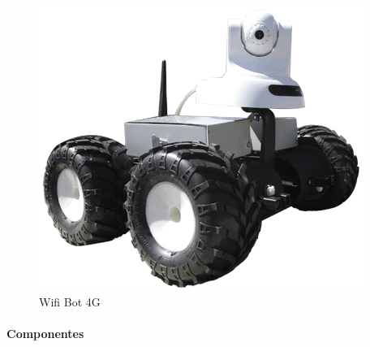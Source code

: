 \documentclass[twoside,12pt]{article}
\begin{document}
\begin{figure}[ht]
\centering
\includegraphics[scale=0.5]{images/Visuel_Wifibot_2.png} 
\caption{Wifi Bot 4G}
\label{fig:Wifi Bot 4G}
\end{figure}

\paragraph{Componentes}
\end{document}
